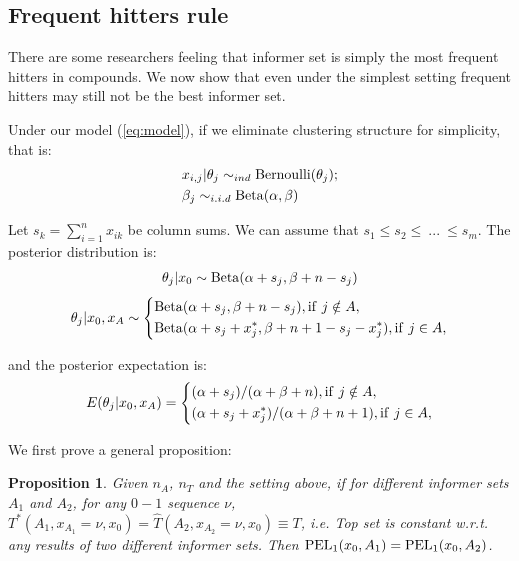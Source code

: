 \documentclass[12pt]{article}
\newtheorem{proposition}{Proposition}
\begin{document}
\subsection{Frequent hitters rule}

There are some researchers feeling that informer set is simply the most frequent hitters in compounds. We now show that even under the simplest setting frequent hitters may still not be the best informer set. 

Under our model (\ref{eq:model}), if we eliminate clustering structure for simplicity, that is:
\begin{eqnarray*}
&x_{i,j}|\theta_j \sim_{ind} {\rm Bernoulli}(\theta_j);\\
&\beta_j \sim_{i.i.d} {\rm Beta}(\alpha,\beta)
\end{eqnarray*}

Let $s_k = \sum_{i = 1}^n x_{ik}$ be column sums. We can assume that $s_1 \leq s_2 \leq~...~\leq s_m$.
The posterior distribution is:
\begin{eqnarray*}
\theta_j | x_0 \sim {\rm Beta}(\alpha + s_j, \beta + n - s_j)
\end{eqnarray*}
\begin{equation}
\theta_j|x_0,x_A \sim \left\{
\begin{aligned}
&{\rm Beta}(\alpha+s_j, \beta+n-s_j),{\rm if}~j\notin A,\\
&{\rm Beta}(\alpha+s_j+x_j^*, \beta+n+1-s_j-x_j^*),{\rm if}~j\in A,\\
\end{aligned}
\right.
\end{equation}

and the posterior expectation is:
\begin{equation}
E(\theta_j|x_0,x_A) = \left\{
\begin{aligned}
&(\alpha + s_j)/(\alpha + \beta + n),{\rm if}~j\notin A,\\
&(\alpha + s_j + x_j^*)/(\alpha + \beta + n +1),{\rm if}~j\in A,\\
\end{aligned}
\right.
\end{equation}

We first prove a general proposition:

\begin{proposition}
Given $n_A$, $n_T$ and the setting above, if for different informer sets $A_1$ and $A_2$, for any $0-1$ sequence $\nu$, $T^*(A_1, x_{A_1} = \nu,x_0) = \hat{T}(A_2,x_{A_2} = \nu,x_0) \equiv T$, i.e. Top set is constant w.r.t. any results of two different informer sets. Then ${\rm PEL}_1(x_0, A_1) = {\rm PEL}_1(x_0, A_2)$.
\end{proposition}
\end{document}
